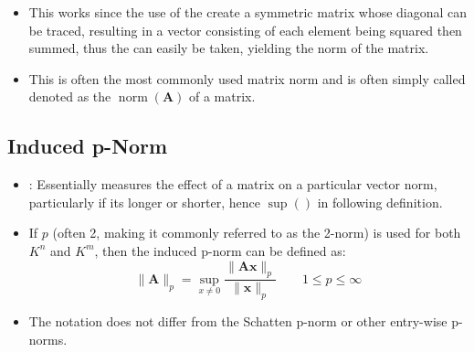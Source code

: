 \begin{itemize}
\begin{itemize}
\[    \]%
    \begin{itemize}
      \item This works since the use of the \hyperref[Hadamard Multiplication]{} create a symmetric matrix whose diagonal can be traced, resulting in a vector consisting of each element being squared then summed, thus the \hyperref[Vector Length]{} can easily be taken, yielding the norm of the matrix.
      \item This is often the most commonly used matrix norm and is often simply called denoted as the \(\operatorname{norm}(\bm{A})\) of a matrix.
    \end{itemize}
  \end{itemize}

  \subsection{Induced p-Norm}\label{Induced 2-norm}
  \begin{itemize}
    \item {}: Essentially measures the effect of a matrix on a particular vector norm, particularly if its longer or shorter, hence \(\sup()\) in following definition.
    \item If \(p\) (often 2, making it commonly referred to as the 2-norm) is used for both \(K^n\) and \(K^m\), then the induced p-norm can be defined as:
    \[%
    \| \bm{A} \|_p = \sup_{x\neq 0} \frac{\| \bm{Ax} \|_p}{\| \bm{x} \|_p} \qquad
    1 \leq p \leq \infty
    \]%
    \item The notation does not differ from the Schatten p-norm or other entry-wise p-norms. 
  \end{itemize}
  

\end{itemize}
